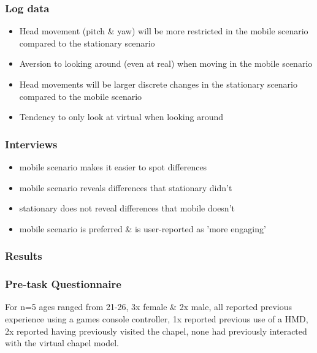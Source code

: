 \subsubsection{Log data}
\begin{itemize}
	\item Head movement (pitch \& yaw) will be more restricted in the mobile scenario compared to the stationary scenario
	\item Aversion to looking around (even at real) when moving in the mobile scenario
	\item Head movements will be larger discrete changes in the stationary scenario compared to the mobile scenario
	\item Tendency to only look at virtual when looking around
\end{itemize}

\subsubsection{Interviews}
\begin{itemize}
	\item mobile scenario makes it easier to spot differences
	\item mobile scenario reveals differences that stationary didn't
	\item stationary does not reveal differences that mobile doesn't
	\item mobile scenario is preferred \& is user-reported as 'more engaging'
\end{itemize}


\subsubsection{Results}

\subsubsection{Pre-task Questionnaire}

For n=5 ages ranged from 21-26, 3x female \& 2x male, all reported previous experience using a games console controller, 1x reported previous use of a HMD, 2x reported having previously visited the chapel, none had previously interacted with the virtual chapel model.


